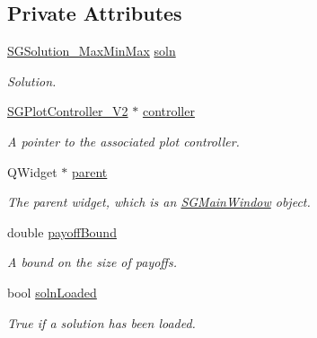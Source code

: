 \subsection*{Private Attributes}
\begin{DoxyCompactItemize}
\item 
\hyperlink{classSGSolution__MaxMinMax}{S\+G\+Solution\+\_\+\+Max\+Min\+Max} \hyperlink{classSGSolutionHandler__V2_aa30a9feaa68d90e4c83656249d18bb24}{soln}
\begin{DoxyCompactList}\small\item\em Solution. \end{DoxyCompactList}\item 
\mbox{\label{classSGSolutionHandler__V2_ababda59d921e6caead92064331b2d8b0}} 
\hyperlink{classSGPlotController__V2}{S\+G\+Plot\+Controller\+\_\+\+V2} $\ast$ \hyperlink{classSGSolutionHandler__V2_ababda59d921e6caead92064331b2d8b0}{controller}
\begin{DoxyCompactList}\small\item\em A pointer to the associated plot controller. \end{DoxyCompactList}\item 
\mbox{\label{classSGSolutionHandler__V2_aff9b574fe2cfb263a9328baebd0744f1}} 
Q\+Widget $\ast$ \hyperlink{classSGSolutionHandler__V2_aff9b574fe2cfb263a9328baebd0744f1}{parent}
\begin{DoxyCompactList}\small\item\em The parent widget, which is an \hyperlink{classSGMainWindow}{S\+G\+Main\+Window} object. \end{DoxyCompactList}\item 
\mbox{\label{classSGSolutionHandler__V2_a576bfe4e669fb618444378caff9465b7}} 
double \hyperlink{classSGSolutionHandler__V2_a576bfe4e669fb618444378caff9465b7}{payoff\+Bound}
\begin{DoxyCompactList}\small\item\em A bound on the size of payoffs. \end{DoxyCompactList}\item 
\mbox{\label{classSGSolutionHandler__V2_a9b3b6bc7d1f1c63479abfb49e0f579e1}} 
bool \hyperlink{classSGSolutionHandler__V2_a9b3b6bc7d1f1c63479abfb49e0f579e1}{soln\+Loaded}
\begin{DoxyCompactList}\small\item\em True if a solution has been loaded. \end{DoxyCompactList}\item 

\end{DoxyCompactItemize}
